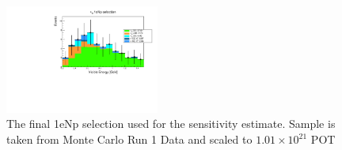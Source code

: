 \documentclass[a4paper]{article}
\begin{document}

\begin{figure}[H]
    \begin{center}
    \includegraphics[width=0.45\textwidth]{Sensitivity/nue_reco_e_genietune_run1_nueStacked.pdf}
    \caption{\label{fig:1eNp:box:sensitivitysample} The final 1eNp selection used for the sensitivity estimate. Sample is taken from Monte Carlo Run 1 Data and scaled to $1.01\times10^{21}$ POT}
    \end{center}
\end{figure}
\end{document}

